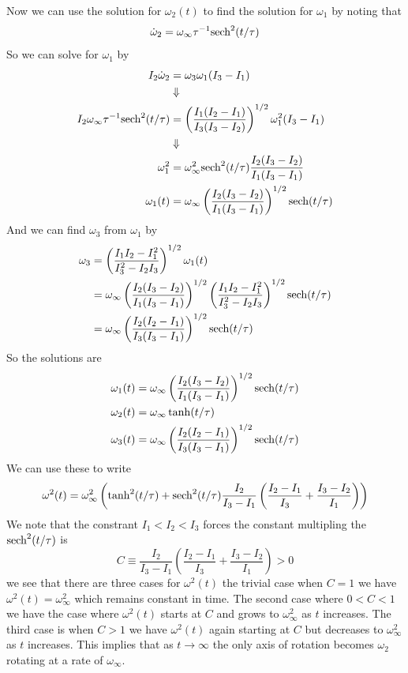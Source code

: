 \documentclass[11pt]{article}
\numberwithin{equation}{section}
\begin{document}
Now we can use the solution for $\omega_2(t)$ to find the solution for $\omega_1$ by noting 
that
$$\dot{\omega}_2 = \omega_{\infty}\tau^{-1}\textnormal{sech}^2(t/\tau)$$
So we can solve for $\omega_1$ by
\begin{align*}
I_2\dot{\omega}_2 &= \omega_{3}\omega_{1}(I_3-I_1)\\
&\Downarrow\\
I_2\omega_{\infty}\tau^{-1}\textnormal{sech}^2(t/\tau)&= \left(\frac{I_1(I_2-I_1)}{I_3(I_3-I_2)}\right)^{1/2}\omega_{1}^2(I_3-I_1)\\
&\Downarrow\\
\omega_{1}^2 &= \omega_{\infty}^2\textnormal{sech}^2(t/\tau)\frac{I_2(I_3-I_2)}{I_1(I_3-I_1)}\\
\omega_{1}(t) &= \omega_{\infty}\left(\frac{I_2(I_3-I_2)}{I_1(I_3-I_1)}\right)^{1/2}\textnormal{sech}(t/\tau)
\end{align*}
And we can find $\omega_3$ from $\omega_1$ by
\begin{align*}
\omega_3 &= \left(\frac{I_1I_2-I_1^2}{I_3^2-I_2I_3}\right)^{1/2}\omega_1(t)\\
&= \omega_{\infty}\left(\frac{I_2(I_3-I_2)}{I_1(I_3-I_1)}\right)^{1/2}\left(\frac{I_1I_2-I_1^2}{I_3^2-I_2I_3}\right)^{1/2}\textnormal{sech}(t/\tau)\\
&= \omega_{\infty}\left(\frac{I_2(I_2-I_1)}{I_3(I_3-I_1)}\right)^{1/2}\textnormal{sech}(t/\tau)
\end{align*}
So the solutions are
\begin{align*}
\omega_{1}(t) &= \omega_{\infty}\left(\frac{I_2(I_3-I_2)}{I_1(I_3-I_1)}\right)^{1/2}\textnormal{sech}(t/\tau)\\
\omega_2(t) &= \omega_{\infty}\tanh(t/\tau)\\
\omega_3(t) &= \omega_{\infty}\left(\frac{I_2(I_2-I_1)}{I_3(I_3-I_1)}\right)^{1/2}\textnormal{sech}(t/\tau)
\end{align*}
We can use these to write 
$$\omega^2(t) = \omega_{\infty}^2\left(\tanh^2(t/\tau)+\textnormal{sech}^2(t/\tau)\frac{I_2}{I_3-I_1}\left(\frac{I_2-I_1}{I_3}+\frac{I_3-I_2}{I_1}\right)\right)$$
We note that the constrant $I_1<I_2<I_3$ forces the constant multipling the $\textnormal{sech}^2(t/\tau)$ is
$$C\equiv\frac{I_2}{I_3-I_1}\left(\frac{I_2-I_1}{I_3}+\frac{I_3-I_2}{I_1}\right) > 0$$
we see that there are three cases for $\omega^2(t)$ the trivial case when $C=1$ we have 
$\omega^2(t)=\omega_{\infty}^2$ which remains constant in time. The second case where $0<C<1$
we have the case where $\omega^2(t)$ starts at $C$ and grows to $\omega_{\infty}^2$ as $t$ 
increases. The third case is when $C>1$ we have $\omega^2(t)$ again starting at $C$ but 
decreases to $\omega_{\infty}^2$ as $t$ increases. This implies that as $t\rightarrow\infty$
the only axis of rotation becomes $\omega_2$ rotating at a rate of $\omega_{\infty}$.
\end{document}
